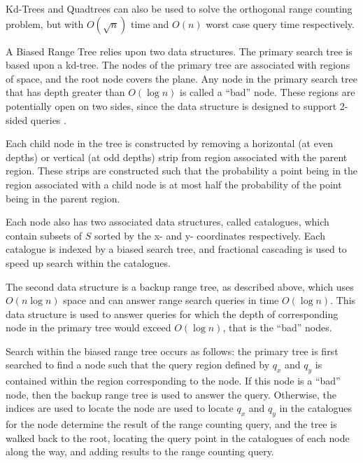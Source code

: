 \documentclass[mcs]{scsthesis}
\begin{document}
Kd-Trees and Quadtrees can also be used to solve the orthogonal range counting
problem, but with \(O(\sqrt n)\) time and \(O(n)\) worst case query time
respectively.




A Biased Range Tree relies upon two data structures. The primary search tree
is based upon a kd-tree. The nodes of the primary tree are associated with
regions of space, and the root node covers the plane. Any node in the primary
search tree that has depth greater than \(O(\log n)\) is called a ``bad'' node.
These regions are potentially open on two sides, since the data structure is
designed to support 2-sided queries \cite{biasedrange}. 

Each child node in the tree is constructed by removing a horizontal (at even
depths) or vertical (at odd depths) strip from region associated with the
parent region. These strips are constructed such that the probability a point
being in the region associated with a child node is at most half the probability
of the point being in the parent region.

Each node also has two associated data structures, called catalogues, which
contain subsets of \(S\) sorted by the x- and y- coordinates respectively.
Each catalogue is indexed by a biased search tree, and fractional cascading is
used to speed up search within the catalogues.

The second data structure is a backup range tree, as described above, which
uses \(O(n \log n)\) space and can answer range search queries in time
\(O(\log n)\). This data structure is used to answer queries for which the
depth of corresponding node in the primary tree would exceed \(O(\log n)\),
that is the ``bad'' nodes.

Search within the biased range tree occurs as follows: the primary tree is
first searched to find a node such that the query region defined by \(q_x\) and
\(q_y\) is contained within the region corresponding to the node. If this node
is a ``bad'' node, then the backup range tree is used to answer the query.
Otherwise, the indices are used to locate the node are used to locate \(q_x\)
and \(q_y\) in the catalogues for the node determine the result of the range
counting query, and the tree is walked back to the root, locating the query
point in the catalogues of each node along the way, and adding results to
the range counting query.
\end{document}
